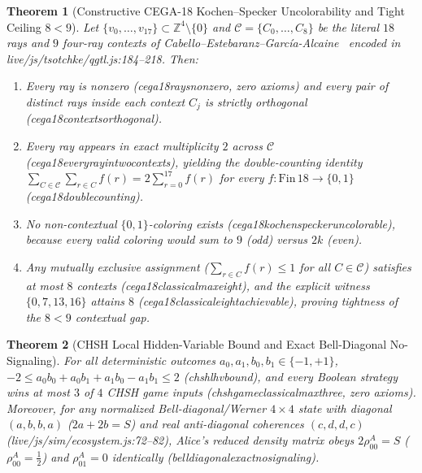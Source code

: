 \documentclass[11pt,a4paper]{article}
\numberwithin{equation}{section}
\theoremstyle{plain}
\newtheorem{theorem}{Theorem}[section]
\theoremstyle{definition}
\theoremstyle{remark}
\newcommand{\Z}{\mathbb{Z}}
\newcommand{\code}[1]{{\ttfamily\footnotesize\def\_{\textunderscore\penalty0\hskip0pt}#1}}
\begin{document}
\begin{theorem}[Constructive \code{CEGA-18} Kochen--Specker Uncolorability and Tight Ceiling $8 < 9$]
\label{thm:cega}
Let $\{v_0,\dots,v_{17}\} \subset \Z^4 \setminus \{0\}$ and $\mathcal{C} = \{C_0,\dots,C_8\}$ be the literal $18$ rays and $9$ four-ray contexts of Cabello--Estebaranz--Garc\'ia-Alcaine~\cite{Cabello1996} encoded in \code{live/js/tsotchke/qgtl.js:184--218}. Then:
\begin{enumerate}[leftmargin=1.8em,itemsep=1pt]
  \item Every ray is nonzero (\code{cega18\_rays\_nonzero}, zero axioms) and every pair of distinct rays inside each context $C_j$ is strictly orthogonal (\code{cega18\_contexts\_orthogonal}).
  \item Every ray appears in \emph{exact} multiplicity $2$ across $\mathcal{C}$ (\code{cega18\_every\_ray\_in\_two\_contexts}), yielding the double-counting identity $\sum_{C\in\mathcal{C}} \sum_{r\in C} f(r) = 2\sum_{r=0}^{17} f(r)$ for every $f : \mathrm{Fin}\,18 \to \{0,1\}$ (\code{cega18\_double\_counting}).
  \item No non-contextual $\{0,1\}$-coloring exists (\code{cega18\_kochen\_specker\_uncolorable}), because every valid coloring would sum to $9$ (odd) versus $2k$ (even).
  \item Any mutually exclusive assignment ($\sum_{r\in C} f(r) \le 1$ for all $C\in\mathcal{C}$) satisfies at most $8$ contexts (\code{cega18\_classical\_max\_eight}), and the explicit witness $\{0, 7, 13, 16\}$ attains $8$ (\code{cega18\_classical\_eight\_achievable}), proving tightness of the $8 < 9$ contextual gap.
\end{enumerate}
\end{theorem}

\begin{theorem}[CHSH Local Hidden-Variable Bound and Exact Bell-Diagonal No-Signaling]
\label{thm:chsh}
For all deterministic outcomes $a_0, a_1, b_0, b_1 \in \{-1, +1\}$, $-2 \le a_0 b_0 + a_0 b_1 + a_1 b_0 - a_1 b_1 \le 2$ (\code{chsh\_lhv\_bound}), and every Boolean strategy wins at most $3$ of $4$ CHSH game inputs (\code{chsh\_game\_classical\_max\_three}, zero axioms). Moreover, for any normalized Bell-diagonal/Werner $4\times 4$ state with diagonal $(a,b,b,a)$ ($2a+2b = S$) and real anti-diagonal coherences $(c,d,d,c)$ (\code{live/js/sim/ecosystem.js:72--82}), Alice's reduced density matrix obeys $2\rho^A_{00} = S$ ($\rho^A_{00}=\tfrac{1}{2}$) and $\rho^A_{01}=0$ identically (\code{bell\_diagonal\_exact\_no\_signaling}).
\end{theorem}
\end{document}

